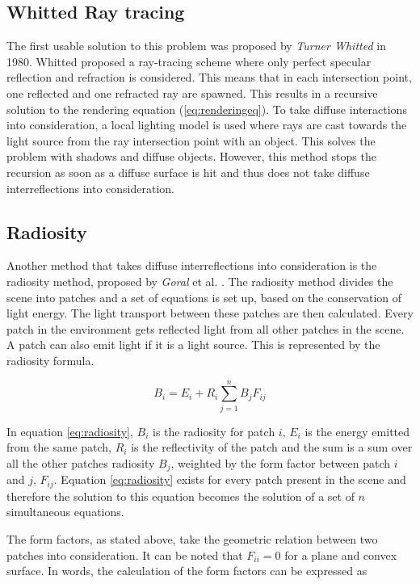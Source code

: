 \documentclass[a4paper]{report}
\begin{document}
\subsection{Whitted Ray tracing}

The first usable solution to this problem was proposed by \emph{Turner
Whitted} \cite{whitted} in 1980. Whitted proposed a ray-tracing scheme
where only perfect specular reflection and refraction is
considered. This means that in each intersection point, one reflected
and one refracted ray are spawned. This results in a recursive
solution to the rendering equation (\ref{eq:renderingeq}). To take
diffuse interactions into consideration, a local
lighting model is used where rays are cast towards the light source
from the ray intersection point with an object. This solves the
problem with shadows and diffuse objects. However, this method stops
the recursion as soon as a diffuse surface is hit and thus does not
take diffuse interreflections into consideration.

\subsection{Radiosity}

Another method that takes diffuse interreflections into consideration
is the radiosity method, proposed by \emph{Goral} et al. \cite{goral}. The
radiosity method divides the scene into patches and a set of equations
is set up, based on the conservation of light energy. The light transport
between these patches are then calculated. Every patch in the
environment gets reflected light from all other patches in the
scene. A patch can also emit light if it is a light source. This is
represented by the radiosity formula.

\begin{equation}
  B_i = E_i + R_i\sum^n_{j=1}B_jF_{ij}
  \label{eq:radiosity}
\end{equation}

In equation \ref{eq:radiosity}, \(B_i\) is the radiosity for
patch \(i\), \(E_i\) is the energy emitted from the same patch,
\(R_i\) is the reflectivity of the patch and the sum is a sum over all
the other patches radiosity \(B_j\), weighted by the form factor
between patch \(i\) and \(j\), \(F_{ij}\). Equation \ref{eq:radiosity}
exists for every patch present in the scene and therefore the solution
to this equation becomes the solution of a set of \(n\) simultaneous equations.

The form factors, as stated above, take the geometric relation between
two patches into consideration. It can be noted that \(F_{ii} = 0 \)
for a plane and convex surface. In words, the calculation of the form
factors can be expressed as
\end{document}
